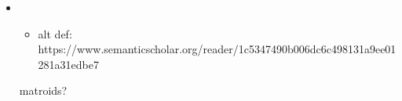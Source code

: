 \begin{itemize}




	\item
	\begin{itemize}
		\item
		alt def: https://www.semanticscholar.org/reader/1c5347490b006dc6c498131a9ee01281a31edbe7
	\end{itemize}
	matroids?





%


\end{itemize}
